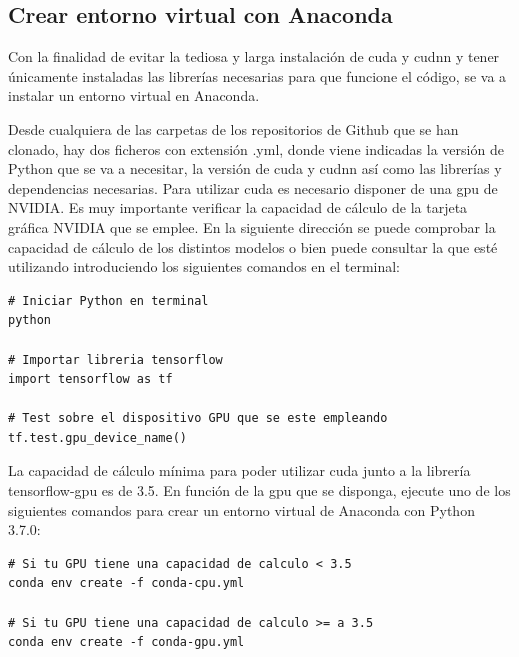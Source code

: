 \subsection{Crear entorno virtual con Anaconda}
\label{subsec:creacion-entorno}

Con la finalidad de evitar la tediosa y larga instalación de \gls{cuda} y \gls{cudnn} y tener únicamente instaladas las librerías necesarias para que funcione el código, se va a instalar un entorno virtual en Anaconda.

Desde cualquiera de las carpetas de los repositorios de Github que se han clonado, hay dos ficheros con extensión .yml, donde viene indicadas la versión de Python que se va a necesitar, la versión de \gls{cuda} y \gls{cudnn} así como las librerías y dependencias necesarias. Para utilizar \gls{cuda} es necesario disponer de una \gls{gpu} de NVIDIA. Es muy importante verificar la capacidad de cálculo de la tarjeta gráfica NVIDIA que se emplee. En la siguiente dirección \cite{cuda-gpus} se puede comprobar la capacidad de cálculo de los distintos modelos o bien puede consultar la que esté utilizando introduciendo los siguientes comandos en el terminal:

\vspace{0.5cm}

\begin{lstlisting}[language=iPython,caption=Comprobar capacidad computación de la GPU,captionpos=b,label={lst:check-compute-capability}]
# Iniciar Python en terminal
python

# Importar libreria tensorflow
import tensorflow as tf

# Test sobre el dispositivo GPU que se este empleando
tf.test.gpu_device_name()
\end{lstlisting}

La capacidad de cálculo mínima para poder utilizar \gls{cuda} junto a la librería tensorflow-gpu es de 3.5. En función de la \gls{gpu} que se disponga, ejecute uno de los siguientes comandos para crear un entorno virtual de Anaconda con Python 3.7.0:

\vspace{0.5cm}

\begin{lstlisting}[language=iPython,caption=Creación entorno virtual en Anaconda,captionpos=b,label={lst:crear-env}]
# Si tu GPU tiene una capacidad de calculo < 3.5
conda env create -f conda-cpu.yml

# Si tu GPU tiene una capacidad de calculo >= a 3.5
conda env create -f conda-gpu.yml
\end{lstlisting}

